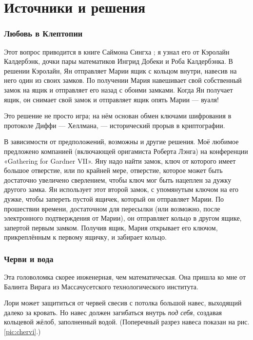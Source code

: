 \section*{Источники и решения}

\subsubsection*{Любовь в Клептопии}

Этот вопрос приводится в книге Саймона Сингха \cite{53};
я узнал его от Кэролайн Калдербэнк, дочки пары математиков Ингрид Добеки и Роба Калдербэнка.
В решении Кэролайн, Ян отправляет Марии ящик с кольцом внутри, навесив на него один из своих замков.
По получении Мария навешивает свой собственный замок на ящик и отправляет его назад с обоими замками.
Когда Ян получает ящик, он снимает свой замок и отправляет ящик опять Марии --- вуаля!

Это решение не просто игра;
на нём основан обмен ключами шифрования в протоколе Диффи — Хеллмана, --- исторический прорыв в криптографии.

В зависимости от предположений, возможны и другие решения.
Моё любимое предложено компанией (включающей оригамиста Роберта Лэнга) на конференции
«Ga\-the\-ring for Gardner VII».
Яну надо найти замок, ключ от которого имеет большое отверстие, или по крайней мере, отверстие, которое может быть достаточно увеличено сверлением, чтобы ключ мог быть нацеплен за дужку другого замка.
Ян использует этот второй замок, с упомянутым ключом на его дужке, чтобы запереть пустой ящичек, который он отправляет Марии.
По прошествии времени, достаточном для пересылки (или возможно, после электронного подтверждения от Марии), он отправляет кольцо в другом ящике, запертой первым замком.
Получив ящик, Мария открывает его ключом, прикреплённым к первому ящичку, и забирает кольцо.

\subsubsection*{Черви и вода}

Эта головоломка скорее инженерная, чем математическая.
Она пришла ко мне от Балинта Вирага из Массачусетского технологического института.

Лори может защититься от червей свесив с потолка большой навес, выходящий далеко за кровать.
Но навес должен загибаться внутрь \emph{под себя}, создавая кольцевой жёлоб, заполненный водой.
(Поперечный разрез навеса показан на рис. \ref{pic:chervi}.)

